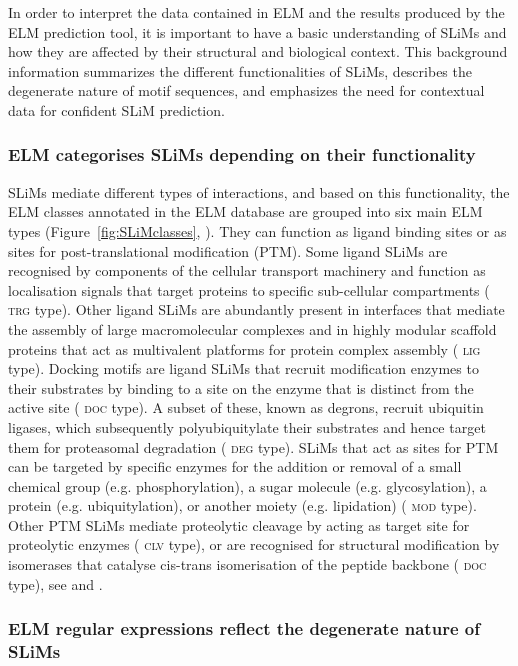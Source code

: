 \documentclass[12pt]{article}
\newcommand\motif[1]{%
    \textsc{\lowercase{#1}}%
}
\begin{document}
In order to interpret the data contained in ELM and the results produced by the
ELM prediction tool, it is important to have a basic understanding of SLiMs
and how they are affected by their structural and biological context. This
background information summarizes the different functionalities of SLiMs,
describes the degenerate nature of motif sequences, and emphasizes the need for
contextual data for confident SLiM prediction.

\subsubsection*{ELM categorises SLiMs depending on their functionality}

SLiMs mediate different types of interactions, and based on this functionality,
the ELM classes annotated in the ELM database are grouped into six main ELM
types (Figure~\ref{fig:SLiMclasses}, \cite{24214962}). They can function as ligand binding sites or
as sites for post-translational modification (PTM). Some ligand SLiMs are
recognised by components of the cellular transport machinery and function as
localisation signals that target proteins to specific sub-cellular compartments
(\motif{TRG} type). Other ligand SLiMs are abundantly present in interfaces that mediate
the assembly of large macromolecular complexes and in highly modular scaffold
proteins that act as multivalent platforms for protein complex assembly
(\motif{LIG} type). Docking motifs are ligand SLiMs that recruit modification enzymes to
their substrates by binding to a site on the enzyme that is distinct from the
active site (\motif{DOC} type). A subset of these, known as degrons, recruit ubiquitin
ligases, which subsequently polyubiquitylate their substrates and hence target
them for proteasomal degradation (\motif{DEG} type). SLiMs that act as sites for PTM can
be targeted by specific enzymes for the addition or removal of a small chemical
group (e.g. phosphorylation), a sugar molecule (e.g. glycosylation), a protein
(e.g. ubiquitylation), or another moiety (e.g. lipidation) (\motif{MOD} type). Other PTM
SLiMs mediate proteolytic cleavage by acting as target site for proteolytic
enzymes (\motif{CLV} type), or are recognised for structural modification by isomerases
that catalyse cis-trans isomerisation of the peptide backbone (\motif{DOC} type), see
\cite{24926813} and \cite{24773235}.

\subsubsection*{ELM regular expressions reflect the degenerate nature of SLiMs}
\end{document}
